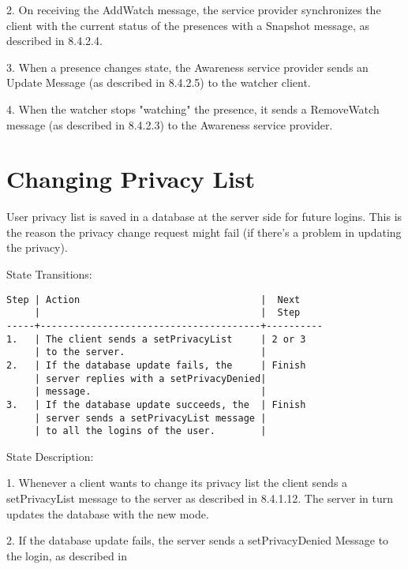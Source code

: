\documentclass[titlepage,oneside]{book}
\begin{document}
\par{} 2. On receiving the AddWatch message, the service provider
synchronizes the client with the current status of the presences with
a Snapshot message, as described in 8.4.2.4.

\par{} 3. When a presence changes state, the Awareness service
provider sends an Update Message (as described in 8.4.2.5) to the
watcher client.

\par{} 4. When the watcher stops "watching" the presence, it sends a
RemoveWatch message (as described in 8.4.2.3) to the Awareness service
provider.

\section{Changing Privacy List}

\par{} User privacy list is saved in a database at the server side for
future logins. This is the reason the privacy change request might
fail (if there's a problem in updating the privacy).

\par{} State Transitions:

\begin{verbatim}
Step | Action                                |  Next
     |                                       |  Step
-----+---------------------------------------+----------
1.   | The client sends a setPrivacyList     | 2 or 3
     | to the server.                        |
2.   | If the database update fails, the     | Finish
     | server replies with a setPrivacyDenied|
     | message.                              |
3.   | If the database update succeeds, the  | Finish
     | server sends a setPrivacyList message |
     | to all the logins of the user.        |
\end{verbatim}

\par{} State Description:

\par{} 1. Whenever a client wants to change its privacy list the
client sends a setPrivacyList message to the server as described in
8.4.1.12. The server in turn updates the database with the new mode.

\par{} 2. If the database update fails, the server sends a
setPrivacyDenied Message to the login, as described in
\end{document}
